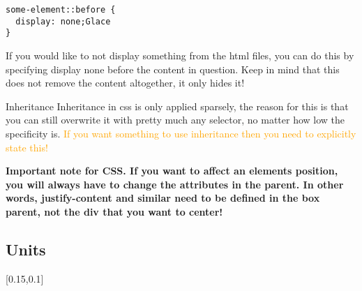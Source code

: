 \documentclass[main.tex,fontsize=6pt,paper=a4,paper=landscape,DIV=calc,]{scrartcl}
\begin{document}
\begin{multicols*}{4}
\vspace{-2mm}
\begin{lstlisting}
some-element::before {
  display: none;Glace
}
\end{lstlisting}
\vspace{2mm}
 If you would like to not display something from the html files, you can do this by specifying
display none before the content in question. \newline Keep in mind that this does not remove the content altogether, it only hides it!


Inheritance  
Inheritance in css is only applied sparsely, the reason for this is that you can still overwrite it with pretty much any selector, no matter how low the specificity is.\newline
\textcolor{orange}{If you want something to use inheritance then you need to explicitly state this!}



\textbf{Important note for CSS. If you want to affect an elements position, you will always have to change the attributes in the parent. \newline
In other words, justify-content and similar need to be defined in the box parent, not the div that you want to center!}

\subsection{Units}
[0.15,0.1]


\end{multicols*}
\end{document}
